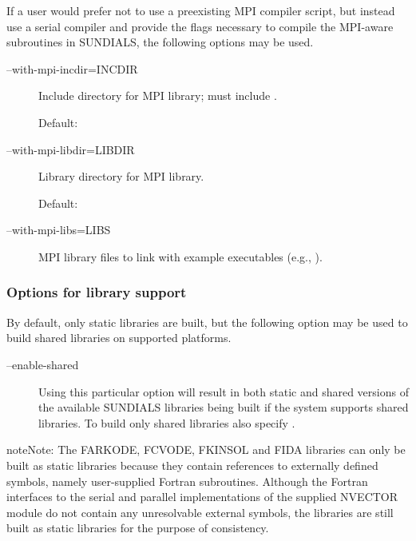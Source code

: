 \documentclass[letterpaper,10pt,english]{sphinxmanual}
\begin{document}
If a user would prefer not to use a preexisting MPI compiler script,
but instead use a serial compiler and provide the flags necessary to
compile the MPI-aware subroutines in SUNDIALS, the following options
may be used.
\begin{description}
\item[{--with-mpi-incdir=INCDIR}] \leavevmode
Include directory for MPI library; must include .

Default: 

\item[{--with-mpi-libdir=LIBDIR}] \leavevmode
Library directory for MPI library.

Default: 

\item[{--with-mpi-libs=LIBS}] \leavevmode
MPI library files to link with example executables (e.g., ).

\end{description}


\subsubsection{Options for library support}
\label{Install:options-for-library-support}
By default, only static libraries are built, but the following option
may be used to build shared libraries on supported platforms.
\begin{description}
\item[{--enable-shared}] \leavevmode
Using this particular option will result in both
static and shared versions of the available SUNDIALS libraries
being built if the system supports shared libraries. To build only
shared libraries also specify .

\end{description}

\begin{notice}{note}{Note:}
The FARKODE, FCVODE, FKINSOL and FIDA libraries can only be
built as static libraries because they contain references to
externally defined symbols, namely user-supplied Fortran
subroutines.  Although the Fortran interfaces to the serial and
parallel implementations of the supplied NVECTOR module do not
contain any unresolvable external symbols, the libraries are still
built as static libraries for the purpose of consistency.
\end{notice}
\end{document}
